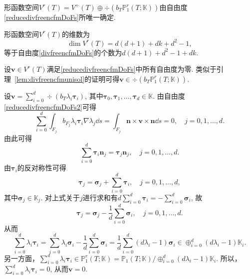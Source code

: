 \begin{lemma}
形函数空间$V^r(T)=V^{\div}(T)\oplus\div(b_T\mathbb P_1^r(T;\mathbb K))$由自由度\eqref{reducedivfreencfmDoFs}所唯一确定.
\end{lemma}
\begin{prf}
形函数空间$V^r(T)$的维数为
\begin{equation*}
\dim V^r(T)= d(d+1)+dk +d^2-1,
\end{equation*}
等于自由度\eqref{divfreencfmDoFs}的个数为$d(d+1) +d^2-1+dk$.

设$\boldsymbol{v}\in V^r(T)$满足\eqref{reducedivfreencfmDoFs}中所有自由度为零. 
类似于引理~\ref{lem:divfreencfmunisol}的证明可得$\boldsymbol{v}\in \div(b_T\mathbb P_1^r(T;\mathbb K))$. 


设$\boldsymbol{v}=\sum_{i=0}^d\div(b_T\lambda_i\boldsymbol{\tau}_i)$, 其中$\boldsymbol{\tau}_0, \boldsymbol{\tau}_1,\ldots, \boldsymbol{\tau}_d\in\mathbb K$. 由自由度\eqref{reducedivfreencfmDoFs2}可得
\begin{equation*}
\sum_{i=0}^d\int_{F_j}b_{F_j}\lambda_{i}\boldsymbol{\tau}_{i}\nabla\lambda_j\dd s=\int_{F_j}\boldsymbol{n}\times \boldsymbol{v} \times\boldsymbol{n}\dd s=0,\quad j=0,1,\ldots,d.
\end{equation*}
由此可得
\begin{equation*}
\sum_{i=0}^d\boldsymbol{\tau}_{i}\boldsymbol{n}_{j}=\boldsymbol{\tau}_{j}\boldsymbol{n}_{j},\quad j=0,1,\ldots,d.
\end{equation*}
由$\boldsymbol{\tau}_{i}$的反对称性可得
\begin{equation*}
\boldsymbol{\tau}_{j}=\boldsymbol{\sigma}_{j}+\sum_{i=0}^d\boldsymbol{\tau}_{i}, \quad j=0,1,\ldots,d,
\end{equation*}
其中$\boldsymbol{\sigma}_{j}\in\mathbb K_j$.
对上式关于$j$进行求和有$d\sum_{i=0}^d\boldsymbol{\tau}_{i}=-\sum_{i=0}^d\boldsymbol{\sigma}_{i}$, 故
\begin{equation*}
\boldsymbol{\tau}_{j}=\boldsymbol{\sigma}_{j}-\frac{1}{d}\sum_{i=0}^d\boldsymbol{\sigma}_{i}, \quad j=0,1,\ldots,d.
\end{equation*}
从而
\begin{equation*}
\sum_{i=0}^d\lambda_i\boldsymbol{\tau}_i=\sum_{i=0}^d\lambda_i\boldsymbol{\sigma}_i-\frac{1}{d}\sum_{i=0}^d\boldsymbol{\sigma}_{i}=\frac{1}{d}\sum_{i=0}^d(d\lambda_i-1)\boldsymbol{\sigma}_i\in \oplus_{i=0}^d(d\lambda_i-1)\mathbb K_i.
\end{equation*}
另一方面，$\sum_{i=0}^d\lambda_i\boldsymbol{\tau}_i\in\mathbb P_1^r(T;\mathbb K)=\mathbb P_1(T;\mathbb K)/\oplus_{i=0}^d(d\lambda_i-1)\mathbb K_i$. 所以，$\sum_{i=0}^d\lambda_i\boldsymbol{\tau}_i=0$, 从而$\boldsymbol{v}=0$.
\end{prf}



